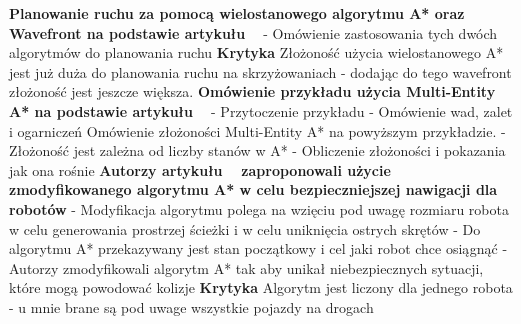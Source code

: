 \newline
\textbf{Planowanie ruchu za pomocą wielostanowego algorytmu A* oraz Wavefront na podstawie artykułu ~\cite{wojnicki2015robust}}
\newline
- Omówienie zastosowania tych dwóch algorytmów do planowania ruchu
\newline
\textbf{Krytyka}
\newline
Złożoność użycia wielostanowego A* jest już duża do planowania ruchu na skrzyżowaniach - dodając do tego wavefront złożoność jest jeszcze większa.
\newline
\newline
\textbf{Omówienie przykładu użycia Multi-Entity A* na podstawie artykułu ~\cite{wojnicki2015robust}}
  \newline
  - Przytoczenie przykładu
  \newline
  - Omówienie wad, zalet i ogarniczeń
  \newline
  \newline
Omówienie złożoności Multi-Entity A* na powyższym przykładzie.
  \newline
  - Złożoność jest zależna od liczby stanów w A*
  \newline
  - Obliczenie złożoności i pokazania jak ona rośnie
\newline
\newline
\textbf{Autorzy artykułu ~\cite{elhalawany2013modified} zaproponowali użycie zmodyfikowanego algorytmu A* w celu bezpieczniejszej nawigacji dla robotów}
  \newline
  - Modyfikacja algorytmu polega na wzięciu pod uwagę rozmiaru robota w celu generowania prostrzej ścieżki i w celu uniknięcia ostrych skrętów
  \newline
  - Do algorytmu A* przekazywany jest stan początkowy i cel jaki robot chce osiągnąć
  \newline
  - Autorzy zmodyfikowali algorytm A* tak aby unikał niebezpiecznych sytuacji, które mogą powodować kolizje
\newline
\newline
\textbf{Krytyka}
\newline
 Algorytm jest liczony dla jednego robota - u mnie brane są pod uwage wszystkie pojazdy na drogach


